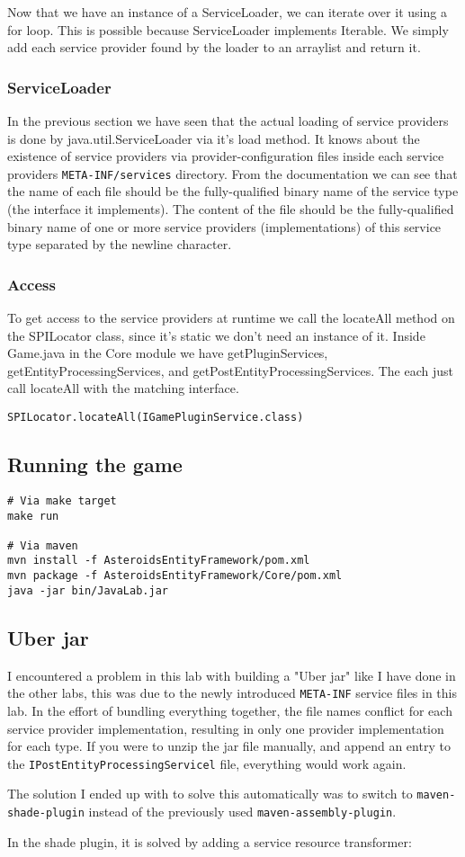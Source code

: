 Now that we have an instance of a ServiceLoader, we can iterate over it using a
for loop. This is possible because ServiceLoader implements Iterable.
We simply add each service provider found by the loader to an arraylist and
return it.

\subsubsection{ServiceLoader}
In the previous section we have seen that the actual loading of service
providers is done by java.util.ServiceLoader via it's load method.
It knows about the existence of service providers via provider-configuration
files inside each service providers \texttt{META-INF/services} directory.
From the documentation \cite{oracle-service-loader} we can see that the name of each file should be the fully-qualified binary name of the service type (the interface it implements). The content of the file
should be the fully-qualified binary name of one or more service providers
(implementations) of this service type separated by the newline character.


\subsubsection{Access}
To get access to the service providers at runtime we call the locateAll method
on the SPILocator class, since it's static we don't need an instance of it.
Inside Game.java in the Core module we have getPluginServices,
getEntityProcessingServices, and getPostEntityProcessingServices.
The each just call locateAll with the matching interface.

\begin{verbatim}
SPILocator.locateAll(IGamePluginService.class)
\end{verbatim}

\subsection{Running the game}
\begin{verbatim}
# Via make target
make run

# Via maven
mvn install -f AsteroidsEntityFramework/pom.xml
mvn package -f AsteroidsEntityFramework/Core/pom.xml
java -jar bin/JavaLab.jar
\end{verbatim}

\subsection{Uber jar} \label{java-lab:uberjar}
I encountered a problem in this lab with building a "Uber jar" like I have done
in the other labs, this was due to the newly introduced \texttt{META-INF}
service files in this lab. In the effort of bundling everything together, the
file names conflict for each service provider implementation, resulting in only
one provider implementation for each type. If you were to unzip the jar file
manually, and append an entry to the \texttt{IPostEntityProcessingServicel} file,
everything would work again.

The solution I ended up with to solve this automatically was to switch to
\texttt{maven-shade-plugin} instead of the previously used
\texttt{maven-assembly-plugin}.

In the shade plugin, it is solved by adding a service resource transformer:
\inputminted{xml}{code/maven-shade.xml}

